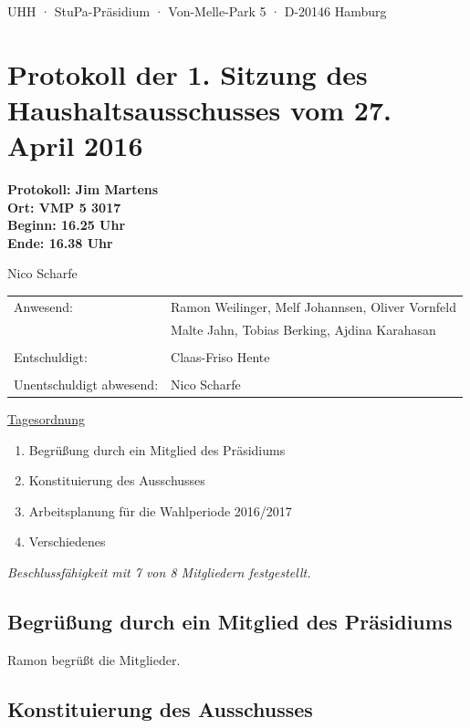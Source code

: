\documentclass[ngerman,headheight=70pt]{scrartcl}
\begin{document}
    UHH · StuPa-Präsidium · Von-Melle-Park 5 · D-20146 Hamburg

    \section*{Protokoll der 1. Sitzung des Haushaltsausschusses vom 27. April 2016}

    \textbf{Protokoll: Jim Martens}\\
    \textbf{Ort: VMP 5 3017}\\
    \textbf{Beginn: 16.25 Uhr}\\
    \textbf{Ende: 16.38 Uhr}

    Nico Scharfe

    \vspace{0.5cm}
    \begin{tabular}{ll}
        Anwesend: & Ramon Weilinger, Melf Johannsen, Oliver Vornfeld \\
                  & Malte Jahn, Tobias Berking, Ajdina Karahasan\\
                  & \\
        Entschuldigt: & Claas-Friso Hente \\
                      &\\
        Unentschuldigt abwesend: & Nico Scharfe \\
    \end{tabular}

    \underline{Tagesordnung}
    \begin{enumerate}[label={\textbf{Top \theenumi}},leftmargin=*]
        \item Begrüßung durch ein Mitglied des Präsidiums
        \item Konstituierung des Ausschusses
        \item Arbeitsplanung für die Wahlperiode 2016/2017
        \item Verschiedenes
    \end{enumerate}

    \textit{Beschlussfähigkeit mit 7 von 8 Mitgliedern festgestellt.}

    \subsection{Begrüßung durch ein Mitglied des Präsidiums}

    Ramon begrüßt die Mitglieder.

    \subsection{Konstituierung des Ausschusses}
\end{document}
